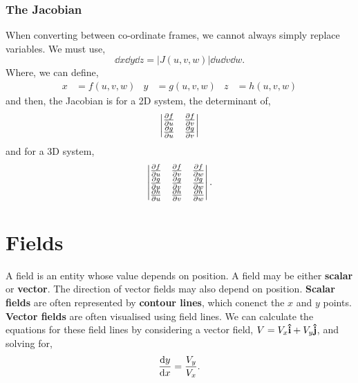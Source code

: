 \documentclass{book}
\begin{document}
\subsection{The Jacobian}
When converting between co-ordinate frames, we cannot always simply replace variables. We must use,
\begin{equation}
    \dd{x}\dd{y}\dd{z} = |J(u,v,w)|\dd{u}\dd{v}\dd{w}.
\end{equation}
Where, we can define,
\begin{align}
    x & = f(u,v,w) & y & = g(u,v,w) &z & = h(u,v,w) 
\end{align}
and then, the Jacobian is for a 2D system, the determinant of,
\begin{equation}
    \begin{vmatrix}
        \pdv{f}{u} & \pdv{f}{v} \\
        \pdv{g}{u} & \pdv{g}{v}
    \end{vmatrix}
\end{equation}
and for a 3D system,
\begin{equation}
    \begin{vmatrix}
         \pdv{f}{u} & \pdv{f}{v} & \pdv{f}{w} \\
        \pdv{g}{u} & \pdv{g}{v} & \pdv{g}{w} \\
        \pdv{h}{u} & \pdv{h}{v} & \pdv{h}{w}
    \end{vmatrix}.
\end{equation}
\chapter{Fields}
A field is an entity whose value depends on position. A field may be either \textbf{scalar} or \textbf{vector}. The direction of vector fields may also depend on position. \textbf{Scalar fields} are often represented by \textbf{contour lines}, which conenct the $x$ and $y$ points. \textbf{Vector fields} are often visualised using field lines. We can calculate the equations for these field lines by considering a vector field, $V = V_x \vu{i} + V_y\vu{j}$, and solving for,
\begin{equation}
    \dv{y}{x} = \frac{V_y}{V_x}.
\end{equation}
\end{document}
